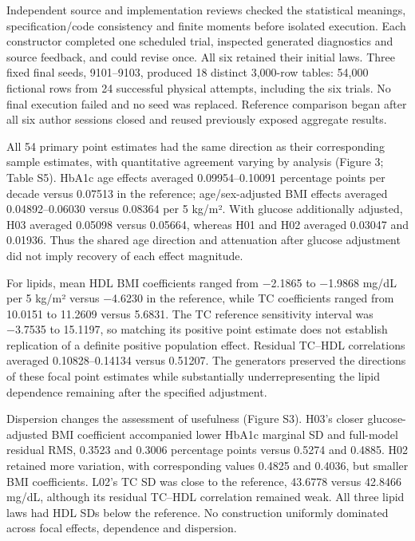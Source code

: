 \documentclass[sigconf,anonymous,review]{acmart}
\begin{document}
Independent source and implementation reviews checked the statistical meanings, specification/\allowbreak{}code consistency and finite moments before isolated execution. Each constructor completed one scheduled trial, inspected generated diagnostics and source feedback, and could revise once. All six retained their initial laws. Three fixed final seeds, 9101–\allowbreak{}9103, produced 18 distinct 3,000-row tables: 54,000 fictional rows from 24 successful physical attempts, including the six trials. No final execution failed and no seed was replaced. Reference comparison began after all six author sessions closed and reused previously exposed aggregate results.


All 54 primary point estimates had the same direction as their corresponding sample estimates, with quantitative agreement varying by analysis (Figure 3; Table S5). HbA1c age effects averaged 0.09954–\allowbreak{}0.10091 percentage points per decade versus 0.07513 in the reference; age/\allowbreak{}sex-adjusted BMI effects averaged 0.04892–\allowbreak{}0.06030 versus 0.08364 per 5 kg/\allowbreak{}m². With glucose additionally adjusted, H03 averaged 0.05098 versus 0.05664, whereas H01 and H02 averaged 0.03047 and 0.01936. Thus the shared age direction and attenuation after glucose adjustment did not imply recovery of each effect magnitude.


For lipids, mean HDL BMI coefficients ranged from −2.1865 to −1.9868 mg/\allowbreak{}dL per 5 kg/\allowbreak{}m² versus −4.6230 in the reference, while TC coefficients ranged from 10.0151 to 11.2609 versus 5.6831. The TC reference sensitivity interval was −3.7535 to 15.1197, so matching its positive point estimate does not establish replication of a definite positive population effect. Residual TC–\allowbreak{}HDL correlations averaged 0.10828–\allowbreak{}0.14134 versus 0.51207. The generators preserved the directions of these focal point estimates while substantially underrepresenting the lipid dependence remaining after the specified adjustment.


Dispersion changes the assessment of usefulness (Figure S3). H03's closer glucose-adjusted BMI coefficient accompanied lower HbA1c marginal SD and full-model residual RMS, 0.3523 and 0.3006 percentage points versus 0.5274 and 0.4885. H02 retained more variation, with corresponding values 0.4825 and 0.4036, but smaller BMI coefficients. L02's TC SD was close to the reference, 43.6778 versus 42.8466 mg/\allowbreak{}dL, although its residual TC–\allowbreak{}HDL correlation remained weak. All three lipid laws had HDL SDs below the reference. No construction uniformly dominated across focal effects, dependence and dispersion.
\end{document}
